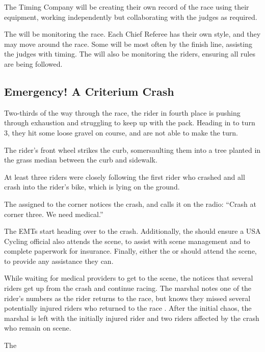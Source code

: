 The Timing Company will be creating their own record of the race using their equipment, working independently but collaborating with the judges as required.

The  will be monitoring the race.  Each Chief Referee has their own style, and they may move around the race.
Some will be most often by the finish line, assisting the judges with timing.
The  will also be monitoring the riders, ensuring all rules are being followed.

\subsection[Criterium Crash]{Emergency! A Criterium Crash}

Two-thirds of the way through the race, the rider in fourth place is pushing through exhaustion and struggling to keep up with the pack.
Heading in to turn 3, they hit some loose gravel on course, and are not able to make the turn.

The rider's front wheel strikes the curb, somersaulting them into a tree planted in the grass median between the curb and sidewalk.

At least three riders were closely following the first rider who crashed and all crash into the rider's bike, which is lying on the ground.

The  assigned to the corner notices the crash, and calls it on the radio:
``Crash at corner three.  We need medical.''

The  EMTs start heading over to the crash.
Additionally, the  should ensure a USA Cycling official also attends the scene, to assist with scene management and to complete paperwork
for insurance.
Finally, either the  or  should attend the scene, to provide any assistance they can.

While waiting for medical providers to get to the scene,
the  notices that several riders get up from the crash and continue racing.
The marshal notes one of the rider's numbers as the rider returns to the race,
but knows they missed several potentially injured riders who returned to the race%
.
After the initial chaos, the marshal is left with the initially injured rider and two riders affected by the crash who remain on scene.

The 
